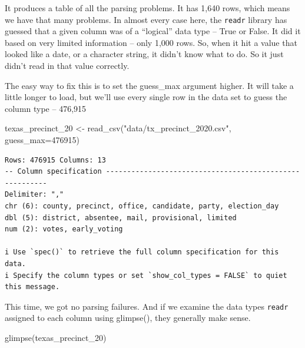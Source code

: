 \documentclass[
  letterpaper,
  DIV=11,
  numbers=noendperiod]{scrreprt}
\newenvironment{Shaded}{\begin{snugshade}}{\end{snugshade}}
\newcommand{\AttributeTok}[1]{\textcolor[rgb]{0.40,0.45,0.13}{#1}}
\newcommand{\DecValTok}[1]{\textcolor[rgb]{0.68,0.00,0.00}{#1}}
\newcommand{\FunctionTok}[1]{\textcolor[rgb]{0.28,0.35,0.67}{#1}}
\newcommand{\NormalTok}[1]{\textcolor[rgb]{0.00,0.23,0.31}{#1}}
\newcommand{\OtherTok}[1]{\textcolor[rgb]{0.00,0.23,0.31}{#1}}
\newcommand{\StringTok}[1]{\textcolor[rgb]{0.13,0.47,0.30}{#1}}
\begin{document}
It produces a table of all the parsing problems. It has 1,640 rows,
which means we have that many problems. In almost every case here, the
\texttt{readr} library has guessed that a given column was of a
``logical'' data type -- True or False. It did it based on very limited
information -- only 1,000 rows. So, when it hit a value that looked like
a date, or a character string, it didn't know what to do. So it just
didn't read in that value correctly.

The easy way to fix this is to set the guess\_max argument higher. It
will take a little longer to load, but we'll use every single row in the
data set to guess the column type -- 476,915

\begin{Shaded}
\begin{Highlighting}[]
\NormalTok{texas\_precinct\_20 }\OtherTok{\textless{}{-}} \FunctionTok{read\_csv}\NormalTok{(}\StringTok{"data/tx\_precinct\_2020.csv"}\NormalTok{, }\AttributeTok{guess\_max=}\DecValTok{476915}\NormalTok{)}
\end{Highlighting}
\end{Shaded}

\begin{verbatim}
Rows: 476915 Columns: 13
-- Column specification --------------------------------------------------------
Delimiter: ","
chr (6): county, precinct, office, candidate, party, election_day
dbl (5): district, absentee, mail, provisional, limited
num (2): votes, early_voting

i Use `spec()` to retrieve the full column specification for this data.
i Specify the column types or set `show_col_types = FALSE` to quiet this message.
\end{verbatim}

This time, we got no parsing failures. And if we examine the data types
\texttt{readr} assigned to each column using glimpse(), they generally
make sense.

\begin{Shaded}
\begin{Highlighting}[]
\FunctionTok{glimpse}\NormalTok{(texas\_precinct\_20)}
\end{Highlighting}
\end{Shaded}
\end{document}
